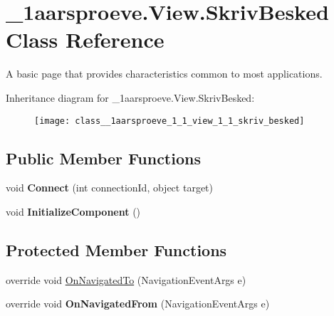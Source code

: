 \hypertarget{class__1aarsproeve_1_1_view_1_1_skriv_besked}{}\section{\+\_\+1aarsproeve.\+View.\+Skriv\+Besked Class Reference}
\label{class__1aarsproeve_1_1_view_1_1_skriv_besked}


A basic page that provides characteristics common to most applications.  


Inheritance diagram for \+\_\+1aarsproeve.\+View.\+Skriv\+Besked\+:\begin{figure}[H]
\begin{center}
\leavevmode
\texttt{[image: class\_\_1aarsproeve\_1\_1\_view\_1\_1\_skriv\_besked]}
\end{center}
\end{figure}
\subsection*{Public Member Functions}
\begin{DoxyCompactItemize}
\item 
\hypertarget{class__1aarsproeve_1_1_view_1_1_skriv_besked_ae9f6ee3a3c0a435a52b6775f6d50652e}{}void {\bfseries Connect} (int connection\+Id, object target)\label{class__1aarsproeve_1_1_view_1_1_skriv_besked_ae9f6ee3a3c0a435a52b6775f6d50652e}

\item 
\hypertarget{class__1aarsproeve_1_1_view_1_1_skriv_besked_a765af0a076e2e07eb3dedf725247aaa1}{}void {\bfseries Initialize\+Component} ()\label{class__1aarsproeve_1_1_view_1_1_skriv_besked_a765af0a076e2e07eb3dedf725247aaa1}

\end{DoxyCompactItemize}
\subsection*{Protected Member Functions}
\begin{DoxyCompactItemize}
\item 
override void \hyperlink{class__1aarsproeve_1_1_view_1_1_skriv_besked_ab0c5a22e91f5f089078bd5e4c1f9cdfe}{On\+Navigated\+To} (Navigation\+Event\+Args e)
\item 
\hypertarget{class__1aarsproeve_1_1_view_1_1_skriv_besked_a4aac18ef6aef2d31b964c778dd4f0f91}{}override void {\bfseries On\+Navigated\+From} (Navigation\+Event\+Args e)\label{class__1aarsproeve_1_1_view_1_1_skriv_besked_a4aac18ef6aef2d31b964c778dd4f0f91}

\end{DoxyCompactItemize}
